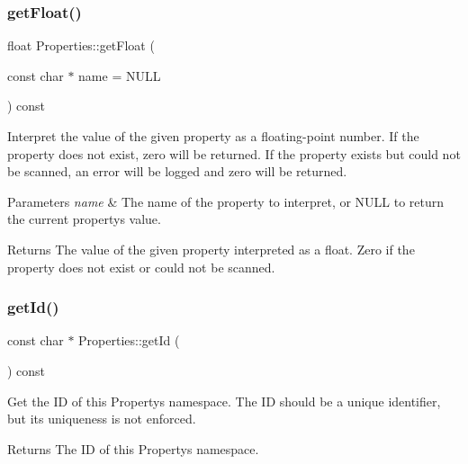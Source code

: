 \subsubsection{\texorpdfstring{get\+Float()}{getFloat()}\hspace{0.1cm}{\footnotesize\ttfamily [2/2]}}
{\footnotesize\ttfamily float Properties\+::get\+Float (\begin{DoxyParamCaption}\item[{const char $\ast$}]{name = {\ttfamily NULL} }\end{DoxyParamCaption}) const}

Interpret the value of the given property as a floating-\/point number. If the property does not exist, zero will be returned. If the property exists but could not be scanned, an error will be logged and zero will be returned.


\begin{DoxyParams}{Parameters}
{\em name} & The name of the property to interpret, or N\+U\+LL to return the current property\textquotesingle{}s value.\\
\hline
\end{DoxyParams}
\begin{DoxyReturn}{Returns}
The value of the given property interpreted as a float. Zero if the property does not exist or could not be scanned. 
\end{DoxyReturn}
\mbox{\label{classProperties_a088abb64299002eb5ad7654306db346f}} 
\subsubsection{\texorpdfstring{get\+Id()}{getId()}\hspace{0.1cm}{\footnotesize\ttfamily [1/2]}}
{\footnotesize\ttfamily const char $\ast$ Properties\+::get\+Id (\begin{DoxyParamCaption}{ }\end{DoxyParamCaption}) const}

Get the ID of this Property\textquotesingle{}s namespace. The ID should be a unique identifier, but its uniqueness is not enforced.

\begin{DoxyReturn}{Returns}
The ID of this Property\textquotesingle{}s namespace. 
\end{DoxyReturn}
\mbox{\label{classProperties_a96950ddf7fbe91c9e061a2e9f89ec42b}} 
